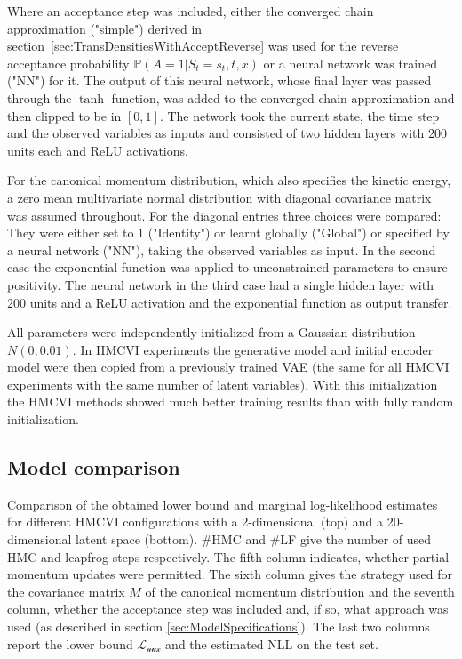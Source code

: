 Where an acceptance step was included, either the converged chain approximation ("simple") derived in section~\ref{sec:TransDensitiesWithAcceptReverse} was used for the reverse acceptance probability $\mathbb{P}(A = 1|S_t = s_t, t, x)$ or a neural network was trained ("NN") for it. The output of this neural network, whose final layer was passed through the $\tanh$ function, was added to the converged chain approximation and then clipped to be in $[0, 1]$. The network took the current state, the time step and the observed variables as inputs and consisted of two hidden layers with 200 units each and ReLU activations.

For the canonical momentum distribution, which also specifies the kinetic energy, a zero mean multivariate normal distribution with diagonal covariance matrix was assumed throughout. For the diagonal entries three choices were compared: They were either set to 1 ("Identity") or learnt globally ("Global") or specified by a neural network ("NN"), taking the observed variables as input. In the second case the exponential function was applied to unconstrained parameters to ensure positivity. The neural network in the third case had a single hidden layer with 200 units and a ReLU activation and the exponential function as output transfer.

All parameters were independently initialized from a Gaussian distribution $N(0, 0.01)$. In HMCVI experiments the generative model and initial encoder model were then copied from a previously trained VAE (the same for all HMCVI experiments with the same number of latent variables). With this initialization the HMCVI methods showed much better training results than with fully random initialization.

\subsection{Model comparison}

\begin{table}[ht]
\centering

\caption{Comparison of the obtained lower bound and marginal log-likelihood estimates for different HMCVI configurations with a 2-dimensional (top) and a 20-dimensional latent space (bottom). \#HMC and \#LF give the number of used HMC and leapfrog steps respectively. The fifth column indicates, whether partial momentum updates were permitted. The sixth column gives the strategy used for the covariance matrix $M$ of the canonical momentum distribution and the seventh column, whether the acceptance step was included and, if so, what approach was used (as described in section \ref{sec:ModelSpecifications}). The last two columns report the lower bound $\mathcal{L_\textrm{aux}}$ and the estimated NLL on the test set.}
\label{tab:Results}
\end{table}

